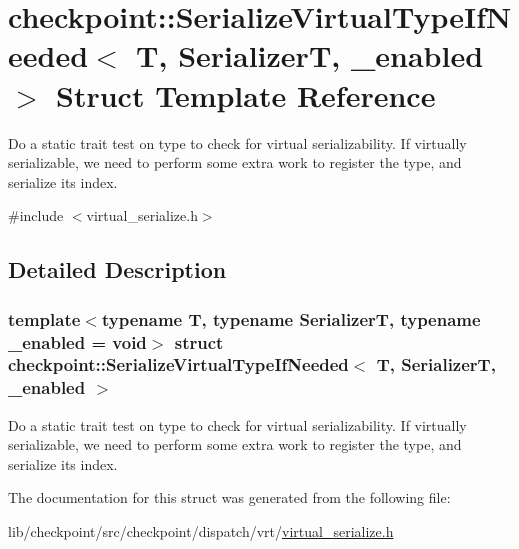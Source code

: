 \hypertarget{structcheckpoint_1_1_serialize_virtual_type_if_needed}{}\section{checkpoint\+:\+:Serialize\+Virtual\+Type\+If\+Needed$<$ T, SerializerT, \+\_\+enabled $>$ Struct Template Reference}
\label{structcheckpoint_1_1_serialize_virtual_type_if_needed}


Do a static trait test on type to check for virtual serializability. If virtually serializable, we need to perform some extra work to register the type, and serialize its index.  




{\ttfamily \#include $<$virtual\+\_\+serialize.\+h$>$}



\subsection{Detailed Description}
\subsubsection*{template$<$typename T, typename SerializerT, typename \+\_\+enabled = void$>$\newline
struct checkpoint\+::\+Serialize\+Virtual\+Type\+If\+Needed$<$ T, Serializer\+T, \+\_\+enabled $>$}

Do a static trait test on type to check for virtual serializability. If virtually serializable, we need to perform some extra work to register the type, and serialize its index. 

The documentation for this struct was generated from the following file\+:\begin{DoxyCompactItemize}
\item 
lib/checkpoint/src/checkpoint/dispatch/vrt/\hyperlink{virtual__serialize_8h}{virtual\+\_\+serialize.\+h}\end{DoxyCompactItemize}
